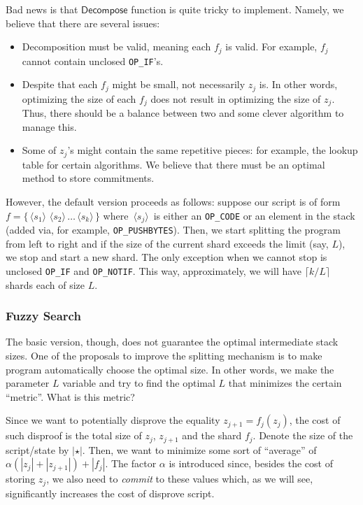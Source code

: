 \documentclass{iacrtrans}
\newcommand{\elem}[1]{\, \langle #1 \rangle \,}
\begin{document}
Bad news is that $\mathsf{Decompose}$ function is quite tricky to implement. Namely, we believe that there are several issues:
\begin{itemize}
    \item Decomposition must be valid, meaning each $f_j$ is valid. For example, $f_j$ cannot contain unclosed \texttt{OP\_IF}'s.
    \item Despite that each $f_j$ might be small, not necessarily $z_j$ is. In other words, optimizing the size of each $f_j$ does not result in optimizing the size of $z_j$. Thus, there should be a balance between two and some clever algorithm to manage this.
    \item Some of $z_j$'s might contain the same repetitive pieces: for example, the lookup table for certain algorithms. We believe that there must be an optimal method to store commitments.
\end{itemize}

However, the default version proceeds as follows: suppose our script is of form $f = \{ \elem{s_1} \elem{s_2} \ldots \elem{s_k} \}$ where $\elem{s_j}$ is either an \texttt{OP\_CODE} or an element in the stack (added via, for example, \texttt{OP\_PUSHBYTES}). Then, we start splitting the program from left to right and if the size of the current shard exceeds the limit (say, $L$), we stop and start a new shard. The only exception when we cannot stop is unclosed \texttt{OP\_IF} and \texttt{OP\_NOTIF}. This way, approximately, we will have $\lceil k/L \rceil$ shards each of size $L$.

\subsubsection{Fuzzy Search}

The basic version, though, does not guarantee the optimal intermediate stack sizes. One of the proposals to improve the splitting mechanism is to make program automatically choose the optimal size. In other words, we make the parameter $L$ variable and try to find the optimal $L$ that minimizes the certain ``metric''. What is this metric?

Since we want to potentially disprove the equality $z_{j+1} = f_j(z_j)$, the cost of such disproof is the total size of $z_j$, $z_{j+1}$ and the shard $f_j$. Denote the size of the script/state by $|\star|$. Then, we want to minimize some sort of ``average'' of $\alpha(|z_j| + |z_{j+1}|) + |f_j|$. The factor $\alpha$ is introduced since, besides the cost of storing $z_j$, we also need to \textit{commit} to these values which, as we will see, significantly increases the cost of disprove script. 
\end{document}
